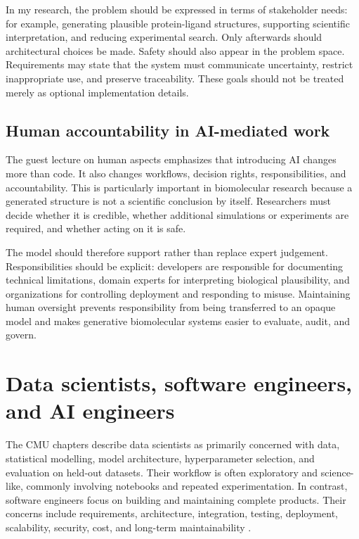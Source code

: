 \documentclass[a4paper,11pt]{article}
\begin{document}
In my research, the problem should be expressed in terms of stakeholder needs: for example, generating plausible protein-ligand structures, supporting scientific interpretation, and reducing experimental search. Only afterwards should architectural choices be made. Safety should also appear in the problem space. Requirements may state that the system must communicate uncertainty, restrict inappropriate use, and preserve traceability. These goals should not be treated merely as optional implementation details.

\subsection{Human accountability in AI-mediated work}

The guest lecture on human aspects emphasizes that introducing AI changes more than code. It also changes workflows, decision rights, responsibilities, and accountability. This is particularly important in biomolecular research because a generated structure is not a scientific conclusion by itself. Researchers must decide whether it is credible, whether additional simulations or experiments are required, and whether acting on it is safe.

The model should therefore support rather than replace expert judgement. Responsibilities should be explicit: developers are responsible for documenting technical limitations, domain experts for interpreting biological plausibility, and organizations for controlling deployment and responding to misuse. Maintaining human oversight prevents responsibility from being transferred to an opaque model and makes generative biomolecular systems easier to evaluate, audit, and govern.

\section{Data scientists, software engineers, and AI engineers}

The CMU chapters describe data scientists as primarily concerned with data,
statistical modelling, model architecture, hyperparameter selection, and
evaluation on held-out datasets. Their workflow is often exploratory and
science-like, commonly involving notebooks and repeated experimentation. In
contrast, software engineers focus on building and maintaining complete
products. Their concerns include requirements, architecture, integration,
testing, deployment, scalability, security, cost, and long-term
maintainability \cite{kastner2025mlip}.
\end{document}
